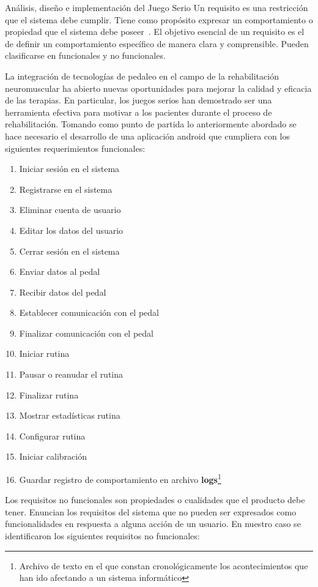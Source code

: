 \begin{thesischapter}{2} {Análisis, diseño e implementación del Juego Serio}
    Un requisito es una restricción que el sistema debe cumplir. Tiene como propósito expresar un comportamiento o propiedad que 
    el sistema debe poseer~\cite{jacobson2000uml}. El objetivo esencial de un requisito es el de definir un comportamiento específico 
    de manera clara y comprensible. Pueden clasificarse en funcionales 
    y no funcionales.

    La integración de tecnologías de pedaleo en el campo de la rehabilitación neuromuscular ha abierto nuevas oportunidades 
    para mejorar la calidad y eficacia de las terapias. En particular, los juegos serios han demostrado ser una herramienta 
    efectiva para motivar a los pacientes durante el proceso de rehabilitación. Tomando como punto de partida lo anteriormente 
    abordado se hace necesario el desarrollo de una aplicación android que cumpliera con los siguientes requerimientos funcionales:    

    \begin{enumerate}
        \item Iniciar sesión en el sistema
        \item Registrarse en el sistema
        \item Eliminar cuenta de usuario
        \item Editar los datos del usuario
        \item Cerrar sesión en el sistema
        \item Enviar datos al pedal
        \item Recibir datos del pedal
        \item Establecer comunicación con el pedal
        \item Finalizar comunicación con el pedal
        \item Iniciar rutina
        \item Pausar o reanudar el rutina
        \item Finalizar rutina
        \item Mostrar estadísticas rutina
        \item Configurar rutina
        \item Iniciar calibración
        \item Guardar registro de comportamiento en archivo \textbf{logs}\footnote{Archivo de texto en el que constan cronológicamente los acontecimientos que han ido afectando a un sistema informático}
    \end{enumerate}
    Los requisitos no funcionales son propiedades o cualidades que el producto debe tener. Enuncian los requisitos del sistema que no pueden ser expresados como funcionalidades en respuesta a alguna acción de un usuario. 
    En nuestro caso se identificaron los siguientes requisitos no funcionales:
        

\end{thesischapter}
